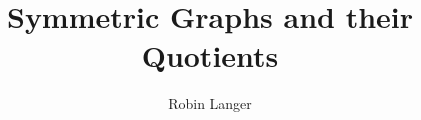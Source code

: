 \documentclass[12pt]{amsbook}
\begin{document}
\title{Symmetric Graphs and their Quotients}
\author{Robin Langer}

\maketitle
\tableofcontents





%

\nocite{*}

\end{document}
